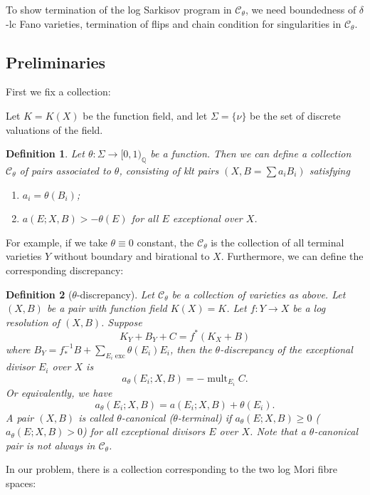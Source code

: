 \documentclass[11pt]{amsart}
\newtheorem{defn}{Definition}[section]
\begin{document}
To show termination of the log Sarkisov program in $\mathcal{C}_{\theta}$, we need boundedness of $\delta$-lc Fano varieties, termination of flips and chain condition for singularities in $\mathcal{C}_{\theta}$. 


\subsection{Preliminaries}

First we fix a collection: 

Let $ K=K(X) $ be the function field, and let $ \Sigma=\{\nu\} $ be the set of discrete valuations of the field. 
\begin{defn}\label{thetacategory}
  \cite[Definition 3.5]{brunoLogSarkisovProgram1995}
  Let  $\theta:\Sigma\to [0,1)_\mathbb{Q}$ be a function. Then we can define a collection $ \mathcal{C}_\theta $ of pairs  associated to $ \theta $, consisting of klt pairs $ (X,B=\sum a_iB_i) $ satisfying
  \begin{enumerate}
    \item $ a_i=\theta(B_i) $;
    \item $ a(E;X,B)>-\theta(E) $ for all $ E $ exceptional over $ X $.
  \end{enumerate} 
\end{defn}
For example, if we take $\theta \equiv 0$ constant, the $\mathcal{C}_{\theta}$ is the collection of all terminal varieties $Y$ without boundary and birational to $X$. Furthermore, we can define the corresponding discrepancy:
\begin{defn}[$\theta$-discrepancy]
  Let $\mathcal{C}_{\theta}$ be a collection of varieties as above. Let $(X,B)$ be a pair with function field $K(X)=K$. Let  $f:Y\to X$ be a log resolution of $(X,B)$. Suppose
  \[
  K_{Y}+B_{Y}+C=f^*(K_{X}+B)
  \]
  where $B_{Y}=f^{-1}_*B+ \sum_{E_{i}\text{ exc}} \theta(E_{i})E_{i}$, then the $\theta$-discrepancy  of the exceptional divisor $E_{i}$ over $X$ is 
  \[
    a_{\theta}(E_{i};X,B)=-\operatorname{mult}_{E_{i}}C.
  \]
 Or equivalently, we have 
 \[
    a_{\theta}(E_{i};X,B)=a(E_{i};X,B)+\theta(E_{i}).
 \]
A pair $(X,B)$ is called $\theta$-canonical ($\theta$-terminal) if $a_{\theta}(E;X,B)\geqslant 0$ ($a_{\theta}(E;X,B)> 0$) for all exceptional  divisors $E$ over $X$.  Note that a $\theta$-canonical pair is not always in $\mathcal{C}_{\theta}$.
\end{defn}
In our problem, there is a collection corresponding to the two log Mori fibre spaces:
\end{document}
